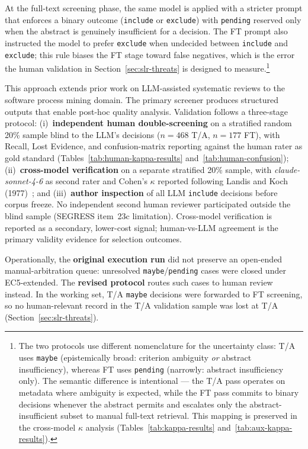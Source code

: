 At the full-text screening phase, the same model is applied with a stricter
prompt that enforces a binary outcome (\texttt{include} or \texttt{exclude})
with \texttt{pending} reserved only when the abstract is genuinely
insufficient for a decision. The FT prompt also instructed the model to
prefer \texttt{exclude} when undecided between \texttt{include} and
\texttt{exclude}; this rule biases the FT stage toward false negatives, which
is the error the human validation in Section~\ref{sec:slr-threats} is
designed to measure.\footnote{The two protocols use different
nomenclature for the uncertainty class: T/A uses \texttt{maybe}
(epistemically broad: criterion ambiguity \emph{or} abstract
insufficiency), whereas FT uses \texttt{pending} (narrowly: abstract
insufficiency only). The semantic difference is intentional --- the
T/A pass operates on metadata where ambiguity is expected, while the FT
pass commits to binary decisions whenever the abstract permits and
escalates only the abstract-insufficient subset to manual full-text
retrieval. This mapping is preserved in the cross-model $\kappa$ analysis
(Tables~\ref{tab:kappa-results} and~\ref{tab:aux-kappa-results}).}

This approach extends prior work on LLM-assisted systematic reviews
\cite{syriani2023,khraisha2024,llm4screenlit2025} to the software process
mining domain. The primary screener produces structured outputs that enable
post-hoc quality analysis. Validation follows a three-stage protocol:
(i)~\textbf{independent human double-screening} on a stratified random 20\%
sample blind to the LLM's decisions ($n=468$ T/A, $n=177$ FT), with Recall,
Lost Evidence, and confusion-matrix reporting against the human rater as gold
standard (Tables~\ref{tab:human-kappa-results} and~\ref{tab:human-confusion});
(ii)~\textbf{cross-model verification} on a separate stratified 20\% sample,
with \textit{claude-sonnet-4-6} as second rater and Cohen's $\kappa$ reported
following Landis and Koch (1977)~\cite{landiskoch1977}; and
(iii)~\textbf{author inspection} of all LLM \texttt{include} decisions before
corpus freeze. No independent second human reviewer participated outside the
blind sample (SEGRESS item~23c limitation). Cross-model verification is
reported as a secondary, lower-cost signal; human-vs-LLM agreement is the
primary validity evidence for selection outcomes.

Operationally, the \textbf{original execution run} did not preserve an
open-ended manual-arbitration queue: unresolved \texttt{maybe}/\texttt{pending}
cases were closed under EC5-extended. The \textbf{revised protocol} routes
such cases to human review instead. In the working set, T/A \texttt{maybe}
decisions were forwarded to FT screening, so no human-relevant record in the
T/A validation sample was lost at T/A (Section~\ref{sec:slr-threats}).


